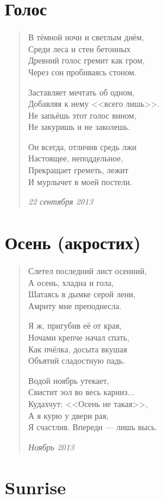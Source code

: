 \documentclass[a4paper,12pt,fleqn]{book}\usepackage{polyglossia}\setdefaultlanguage[babelshorthands=true]{russian}\setotherlanguage{english}\defaultfontfeatures{Ligatures=TeX,Mapping=tex-text}\usepackage{xcolor}\newcommand{\ml}[3]{#2}
\begin{document}
\section{Голос}

\begin{verse}
В тёмной ночи и светлым днём,\\
Среди леса и стен бетонных\\
Древний голос гремит как гром,\\
Через сон пробиваясь стоном.

Заставляет мечтать об одном,\\
Добавляя к нему <<всего лишь>>.\\
Не запьёшь этот голос вином,\\
Не закуришь и не заколешь.

Он всегда, отличив средь лжи\\
Настоящее, неподдельное,\\
Прекращает греметь, лежит\\
И мурлычет в моей постели.

\emph{22 сентября 2013}
\end{verse}
\newpage

\section{Осень (акростих)}

\begin{verse}
Слетел последний лист осенний,\\
А осень, хладна и гола,\\
Шатаясь в дымке серой лени,\\
Амриту мне преподнесла.

Я ж, пригубив её от края,\\
Ночами крепче начал спать,\\
Как пчёлка, досыта вкушая\\
Объятий сладостную падь.

Водой ноябрь утекает,\\
Свистит эол во весь карниз...\\
Кудахчут: <<Осень не такая>>,\\
А я курю у двери рая,\\
Я счастлив. Впереди --- лишь высь.

\emph{Ноябрь 2013}
\end{verse}
\newpage

\section{Sunrise}
\end{document}
